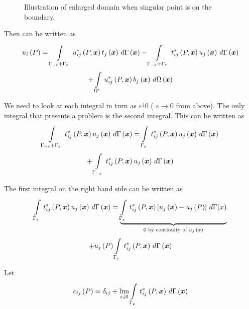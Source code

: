 \begin{figure}[htbp] \centering
  
  \caption{Illustration of enlarged domain when singular point is on the 
    boundary.}
\end{figure}
Then  can be written as
\begin{multline}
  \fnof{u_{i}}{P} = \gint{\Gamma_{-\varepsilon} +\Gamma_{\varepsilon}}{}
  {\fnof{u_{ij}^{*}}{P,\vect{x}}
    \fnof{t_{j}}{\vect{x}}}{\fnof{\Gamma}{\vect{x}}} -
  \gint{\Gamma_{-\varepsilon}+
    \Gamma_{\varepsilon}}{}{\fnof{t_{ij}^{*}}{P,\vect{x}}
    \fnof{u_{j}}{\vect{x}}}{\fnof{\Gamma}{\vect{x}}} \\ +
    \gint{\Omega^{\prime}}{}{\fnof{u_{ij}^*}{P,\vect{x}} \fnof{b_{j}}{\vect{x}}}
    {\fnof{\Omega}{\vect{x}}} 
  \label{eqn:Fwrit}
\end{multline} 

We need to look at each integral in turn as $\varepsilon^{\downarrow}0$ (\ie
$\varepsilon \rightarrow 0$ from above).  The only integral that presents a
problem is the second integral. This can be written as
\begin{multline}
  \gint{\Gamma_{-\varepsilon}+\Gamma_{\varepsilon}}{}{\fnof{t_{ij}^{*}}{P,\vect{x}} \fnof{u_{j}}{\vect{x}}}{\fnof{\Gamma}{\vect{x}}} =
  \gint{\Gamma_{\varepsilon}}{}{\fnof{t_{ij}^{*}}{P,\vect{x}}
    \fnof{u_{j}}{\vect{x}}}{\fnof{\Gamma}{\vect{x}}} \\ +
  \gint{\Gamma_{-\varepsilon}}{}{\fnof{t_{ij}^{*}}{P,\vect{x}}
    \fnof{u_{j}}{\vect{x}}}{\fnof{\Gamma}{\vect{x}}}
  \label{eqn:2ndint}
\end{multline} 

The first integral on the right hand side can be written as
\begin{multline}
  \gint{\Gamma_{\varepsilon}}{}{\fnof{t_{ij}^{*}}{P,\vect{x}}
    \fnof{u_{j}}{\vect{x}}}{\fnof{\Gamma}{\vect{x}}} =
  \underbrace{\gint{\Gamma_{\varepsilon}}{}{\fnof{t_{ij}^{*}}{P,\vect{x}}
      \sqbrac{\fnof{u_{j}}{\vect{x}}-\fnof{u_{j}}{P}}}{\Gamma(x)}}_{\text{$0$
      by continuity of $\fnof{u_{j}}{x}$}} \\ + \fnof{u_{j}}{P}
  \gint{\Gamma_{\varepsilon}}{}{\fnof{t_{ij}^{*}}{P,\vect{x}}}
  {\fnof{\Gamma}{\vect{x}}}
\label{eqn:1stint}
\end{multline}  
  
Let
\begin{equation}
  \fnof{c_{ij}}{P} = \delta_{ij} + \lim_{\varepsilon \downarrow 0}
   \gint{\Gamma_{\varepsilon}}{}{\fnof{t_{ij}^{*}}{P,\vect{x}}}
   {\fnof{\Gamma}{\vect{x}}}
 \label{eqn:eqnG}
\end{equation}

